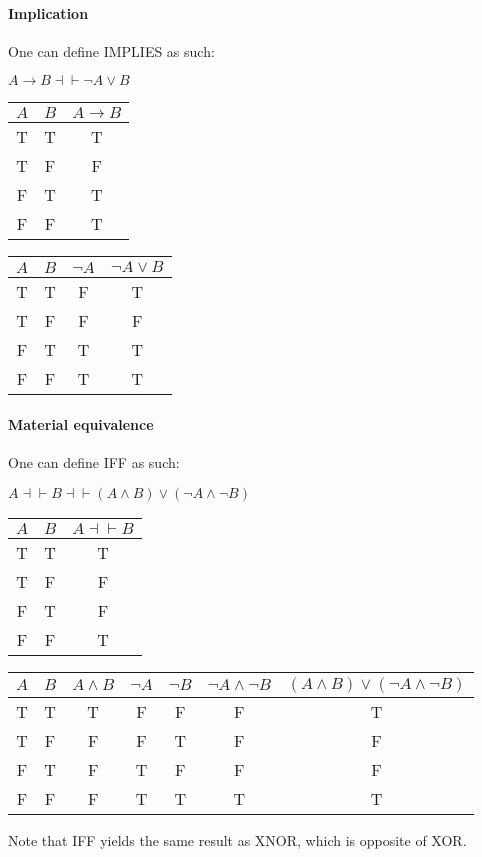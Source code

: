 \documentclass[11pt]{exam}
\begin{document}
\paragraph*{Implication} 
One can define IMPLIES as such:
\begin{center}
    \(A \rightarrow B \dashv \vdash \neg A \vee B\)
\end{center}
\begin{center}
    \begin{tabular}{|c|c|c|}
        \hline
        \(A\) & \(B\) & \(A \rightarrow B\) \\
        \hline
        T & T & T \\
        T & F & F \\
        F & T & T \\
        F & F & T \\
        \hline    
    \end{tabular}
    \begin{tabular}{|c|c|c|c|}
        \hline
        \(A\) & \(B\) & \(\neg A\) & \(\neg A \vee B\) \\
        \hline
        T & T & F & T \\
        T & F & F & F \\
        F & T & T & T \\
        F & F & T & T \\
        \hline       
    \end{tabular}
\end{center}
\paragraph*{Material equivalence}
One can define IFF as such:
\begin{center}
    \(A \dashv \vdash B \dashv \vdash (A \wedge B)\vee(\neg A \wedge \neg B)\)
\end{center}
\begin{center}
    \begin{tabular}{|c|c|c|}
        \hline
        \(A\) & \(B\) & \(A \dashv \vdash B\) \\
        \hline
        T & T & T \\
        T & F & F \\
        F & T & F \\
        F & F & T \\
        \hline
    \end{tabular}
    \begin{tabular}{|c|c|c|c|c|c|c|}
        \hline
        \(A\) & \(B\) & \(A \wedge B\) & \(\neg A\) & \(\neg B\) & \(\neg A \wedge \neg B\) & \((A \wedge B)\vee(\neg A \wedge \neg B)\) \\
        \hline
        T & T & T & F & F & F & T \\
        T & F & F & F & T & F & F \\
        F & T & F & T & F & F & F \\
        F & F & F & T & T & T & T \\
        \hline
    \end{tabular} 
\end{center}
Note that IFF yields the same result as XNOR, which is opposite of XOR.
\end{document}
